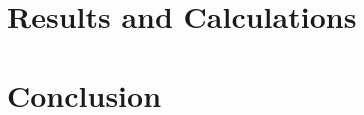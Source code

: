 \documentclass[12pt]{article}
\begin{document}
\section{Results and Calculations} \label{sec:3}



\newpage

\section{Conclusion} \label{sec:4}



\newpage



 \label{sec:ref}

\vspace{1.5cm}

\listoffigures

\listoftables
\end{document}
